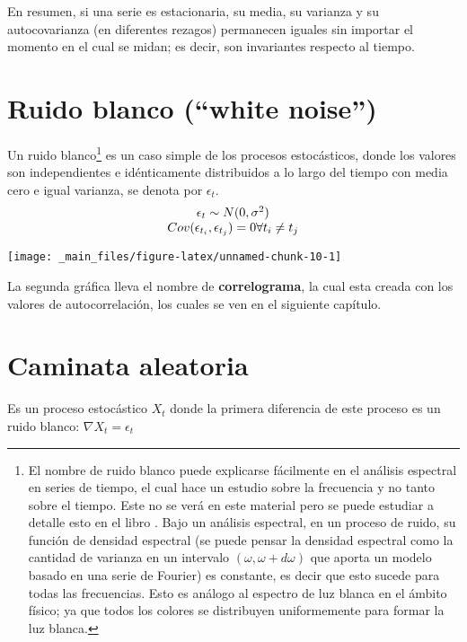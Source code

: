 \documentclass[
  a4paper,
  oneside,
  openany]{book}
\begin{document}
En resumen, si una serie es estacionaria, su media, su varianza y su autocovarianza (en diferentes rezagos) permanecen iguales sin importar el momento en el cual se midan; es decir, son invariantes respecto al tiempo.

\hypertarget{ruido-blanco-white-noise}{%
\section{Ruido blanco (``white noise'')}\label{ruido-blanco-white-noise}}

Un ruido blanco\footnote{El nombre de ruido blanco puede explicarse fácilmente en el análisis espectral en series de tiempo, el cual hace un estudio sobre la frecuencia y no tanto sobre el tiempo. Este no se verá en este material pero se puede estudiar a detalle esto en el libro \citet{cryer2008time}. Bajo un análisis espectral, en un proceso de ruido, su función de densidad espectral (se puede pensar la densidad espectral como la cantidad de varianza en un intervalo \((\omega, \omega+d\omega)\) que aporta un modelo basado en una serie de Fourier) es constante, es decir que esto sucede para todas las frecuencias. Esto es análogo al espectro de luz blanca en el ámbito físico; ya que todos los colores se distribuyen uniformemente para formar la luz blanca.} es un caso simple de los procesos estocásticos, donde los valores son independientes e idénticamente distribuidos a lo largo del tiempo con media cero e igual varianza, se denota por \(\epsilon_t\).
\[
\begin{array}{c}
\epsilon_t \sim N(0,\sigma^2)\\
Cov(\epsilon_{t_i},\epsilon_{t_j})=0 \space \forall t_i \neq t_j
\end{array}
\]

\begin{center}\texttt{[image: \_main\_files/figure-latex/unnamed-chunk-10-1]} \end{center}

La segunda gráfica lleva el nombre de \textbf{correlograma}, la cual esta creada con los valores de autocorrelación, los cuales se ven en el siguiente capítulo.

\hypertarget{caminata-aleatoria}{%
\section{Caminata aleatoria}\label{caminata-aleatoria}}

Es un proceso estocástico \(X_t\) donde la primera diferencia de este proceso es un ruido blanco: \(\nabla X_{t} = \epsilon_t\)
\end{document}

